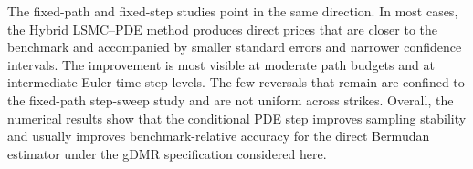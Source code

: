 

The fixed-path and fixed-step studies point in the same direction. In most cases, the Hybrid LSMC--PDE method produces direct prices that are closer to the benchmark and accompanied by smaller standard errors and narrower confidence intervals. The improvement is most visible at moderate path budgets and at intermediate Euler time-step levels. The few reversals that remain are confined to the fixed-path step-sweep study and are not uniform across strikes. Overall, the numerical results show that the conditional PDE step improves sampling stability and usually improves benchmark-relative accuracy for the direct Bermudan estimator under the gDMR specification considered here.
